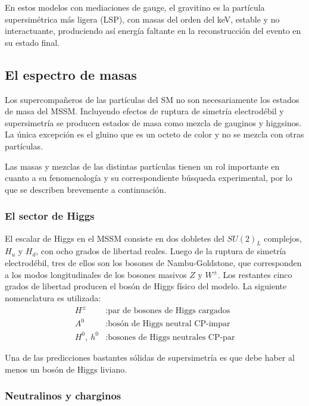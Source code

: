En estos modelos con mediaciones de gauge, el gravitino es la partícula supersimétrica más ligera (LSP), con masas del orden del keV, estable y no interactuante, produciendo así energía faltante en la reconstrucción del evento en su estado final.

\subsection{El espectro de masas}

Los supercompañeros de las partículas del SM no son necesariamente los estados de masa del MSSM. Incluyendo efectos de ruptura de simetría electrodébil y supersimetría se producen estados de masa como mezcla de gauginos y higgsinos. La única excepción es el gluino que es un octeto de color y no se mezcla con otras partículas.

Las masas y mezclas de las distintas partículas tienen un rol importante en cuanto a su fenomenología y su correspondiente búsqueda experimental, por lo que se describen brevemente a continuación.


\subsubsection{El sector de Higgs} 

El escalar de Higgs en el MSSM consiste en dos dobletes del $SU(2)_{L}$ complejos, $H_{u}$ y $H_{d}$, con ocho grados de libertad reales. Luego de la ruptura de simetría electrodébil, tres de ellos son los bosones de Nambu-Goldstone, que corresponden a los modos longitudinales de los bosones masivos $Z$ y $W^{\pm}$. Los restantes cinco grados de libertad producen el bosón de Higgs físico del modelo. La siguiente nomenclatura es utilizada:
\begin{align*}
  H^{\pm} & : \text{par de bosones de Higgs cargados} \\
  A^{0} & : \text{bosón de Higgs neutral CP-impar} \\
  H^{0},\: h^{0} & : \text{bosones de Higgs neutrales CP-par} 
\end{align*}

Una de las predicciones bastantes sólidas de supersimetría es que debe haber al menos un bosón de Higgs liviano.


\subsubsection{Neutralinos y charginos}

